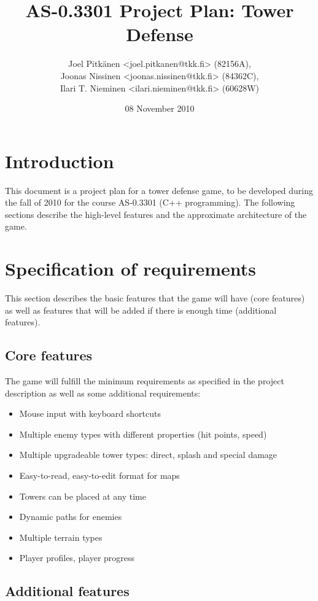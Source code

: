 \documentclass[11pt]{article}
\title{AS-0.3301 Project Plan: Tower Defense}
\author{Joel Pitkänen <joel.pitkanen@tkk.fi> (82156A),\\ Joonas Nissinen <joonas.nissinen@tkk.fi> (84362C),\\ Ilari T. Nieminen <ilari.nieminen@tkk.fi> (60628W)}
\date{08 November 2010}
\begin{document}
\maketitle

\setcounter{tocdepth}{3}
\tableofcontents
\vspace*{1cm}

\section{Introduction}
\label{sec-1}


This document is a project plan for a tower defense game, to be
developed during the fall of 2010 for the course AS-0.3301 (C++
programming). The following sections describe the high-level features
and the approximate architecture of the game. 
\section{Specification of requirements}
\label{sec-2}


This section describes the basic features that the game will have
(core features) as well as features that will be added if there is
enough time (additional features).
\subsection{Core features}
\label{sec-2_1}


   The game will fulfill the minimum requirements as specified in the
   project description as well as some additional requirements:

\begin{itemize}
\item Mouse input with keyboard shortcuts
\item Multiple enemy types with different properties (hit points, speed)
\item Multiple upgradeable tower types: direct, splash and special damage
\item Easy-to-read, easy-to-edit format for maps
\item Towers can be placed at any time
\item Dynamic paths for enemies
\item Multiple terrain types
\item Player profiles, player progress
\end{itemize}
\subsection{Additional features}
\label{sec-2_2}
\end{document}
